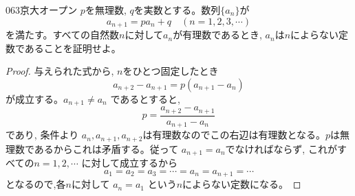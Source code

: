 \begin{prob}{063}{}{京大オープン}
 $p$を無理数, $q$を実数とする。数列$\{a_n\}$が
\[a_{n+1}=pa_n+q \quad (n=1,2,3,\cdots)\]
を満たす。すべての自然数$n$に対して$a_n$が有理数であるとき, $a_n$は$n$によらない定数であることを証明せよ。
\end{prob}

\begin{proof}
与えられた式から, $n$をひとつ固定したとき
\[ a_{n+2}-a_{n+1}=p(a_{n+1}-a_n) \]
が成立する。$a_{n+1}\neq a_n$ であるとすると, 
\[p=\dfrac{a_{n+2}-a_{n+1}}{a_{n+1}-a_{n}}\]
であり, 条件より $a_n, a_{n+1}, a_{n+2}$は有理数なのでこの右辺は有理数となる。$p$は無理数であるからこれは矛盾する。従って $a_{n+1}=a_n$でなければならず, これがすべての$n=1,2,\cdots$ に対して成立するから
\[a_1=a_2=a_3=\cdots =a_n=a_{n+1}=\cdots \]
となるので,各$n$に対して $a_n=a_1$ という$n$によらない定数になる。
\end{proof}

